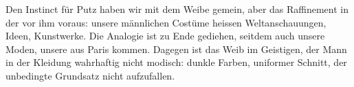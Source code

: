 Den Instinct für Putz haben wir mit dem Weibe gemein, aber das Raffinement in der  vor ihm voraus: unsere männlichen Costüme heissen Weltanschauungen, Ideen, Kunstwerke. Die Analogie ist zu Ende gediehen, seitdem auch unsere Moden, unsere   aus Paris kommen. Dagegen ist das Weib im Geistigen, der Mann in der Kleidung wahrhaftig nicht modisch: dunkle Farben, uniformer Schnitt, der unbedingte Grundsatz nicht aufzufallen.
\par

